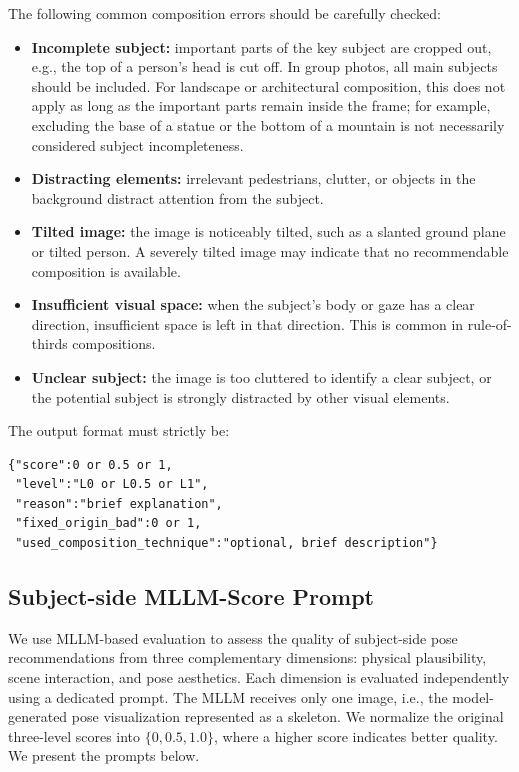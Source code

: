 \documentclass{llmxive}
\begin{document}
\begin{promptbox}
The following common composition errors should be carefully checked:
\begin{itemize}
    \item \textbf{Incomplete subject:} important parts of the key subject are cropped out, e.g., the top of a person's head is cut off. In group photos, all main subjects should be included. For landscape or architectural composition, this does not apply as long as the important parts remain inside the frame; for example, excluding the base of a statue or the bottom of a mountain is not necessarily considered subject incompleteness.
    \item \textbf{Distracting elements:} irrelevant pedestrians, clutter, or objects in the background distract attention from the subject.
    \item \textbf{Tilted image:} the image is noticeably tilted, such as a slanted ground plane or tilted person. A severely tilted image may indicate that no recommendable composition is available.
    \item \textbf{Insufficient visual space:} when the subject's body or gaze has a clear direction, insufficient space is left in that direction. This is common in rule-of-thirds compositions.
    \item \textbf{Unclear subject:} the image is too cluttered to identify a clear subject, or the potential subject is strongly distracted by other visual elements.
\end{itemize}

The output format must strictly be:
\begin{verbatim}
{"score":0 or 0.5 or 1,
 "level":"L0 or L0.5 or L1",
 "reason":"brief explanation",
 "fixed_origin_bad":0 or 1,
 "used_composition_technique":"optional, brief description"}
\end{verbatim}
\end{promptbox}
\subsection{Subject-side MLLM-Score Prompt}
\label{app:subject_mllm_score_prompt}

We use MLLM-based evaluation to assess the quality of subject-side pose recommendations from three complementary dimensions: physical plausibility, scene interaction, and pose aesthetics. Each dimension is evaluated independently using a dedicated prompt. The MLLM receives only one image, i.e., the model-generated pose visualization represented as a skeleton. We normalize the original three-level scores into \(\{0, 0.5, 1.0\}\), where a higher score indicates better quality. We present the prompts below.
\end{document}
